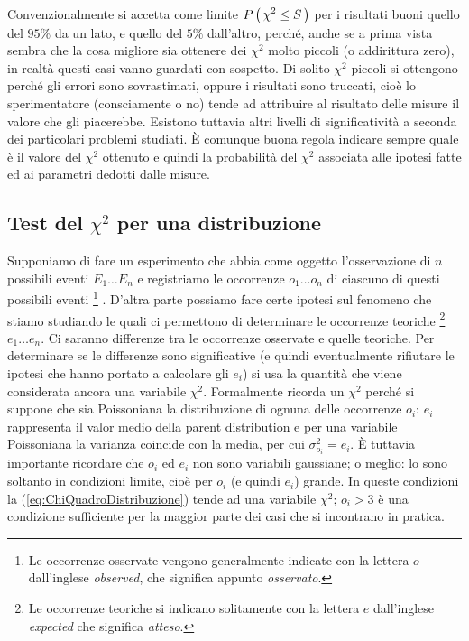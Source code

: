 Convenzionalmente si accetta come limite $\displaystyle P\left(\, \chi^2\le S \, \right)$ per i risultati
buoni quello del $95\%$ da un lato, e quello del $5\%$ dall'altro, perch\'e,
anche se a prima vista sembra che la cosa migliore sia ottenere dei $\chi^2$
molto piccoli (o addirittura zero), in realt\`a questi casi vanno guardati con
sospetto. Di solito $\chi^2$ piccoli si ottengono perch\'e gli errori
sono sovrastimati, oppure i risultati sono truccati,
cio\`e lo sperimentatore (consciamente o no) tende ad attribuire al
risultato delle misure il valore che gli piacerebbe.
Esistono tuttavia altri livelli di significativit\`a a seconda dei
particolari problemi studiati. \`E comunque buona regola indicare sempre
quale \`e il valore del $\chi^2$ ottenuto e quindi la probabilit\`a del
$\chi^2$ associata alle ipotesi fatte ed ai parametri dedotti dalle misure.


\subsection{Test del \texorpdfstring{$\chi^2$}{chi2} per una distribuzione}

Supponiamo di fare un esperimento che abbia come oggetto l'osservazione
di $n$ possibili eventi $E_1 \ldots E_n$ e registriamo le
occorrenze $o_1 \ldots o_n$ di ciascuno di questi possibili eventi%
\footnote{
Le occorrenze osservate vengono generalmente indicate con la lettera $o$
dall'inglese \emph{observed}, che significa appunto \emph{osservato}.
}%
.
D'altra parte possiamo fare certe ipotesi
sul fenomeno che stiamo studiando le quali ci permettono di determinare
le occorrenze teoriche%
\footnote{
Le occorrenze teoriche si indicano solitamente con la lettera $e$ dall'inglese
\emph{expected} che significa \emph{atteso}.
}
$e_1 \ldots e_n$. Ci saranno
differenze tra le occorrenze osservate e quelle teoriche. Per determinare
se le differenze sono significative (e quindi eventualmente rifiutare
le ipotesi che hanno portato a calcolare gli $e_i$) si usa la quantit\`a
che viene considerata ancora una variabile $\chi^2$.
Formalmente ricorda un $\chi^2$ perch\'e si suppone che sia Poissoniana la
distribuzione di ognuna delle occorrenze $o_i$: $e_i$ rappresenta il valor
medio della parent distribution  e per una variabile Poissoniana la varianza
coincide con la media, per cui $\sigma^2_{o_i} = e_i$.
\`E tuttavia importante ricordare che  $o_i$ ed $e_i$ non sono variabili
gaussiane; o meglio: lo sono soltanto in condizioni limite,
cio\`e per $o_i$ (e quindi $e_i$) grande. In queste condizioni la
(\ref{eq:ChiQuadroDistribuzione}) tende ad una variabile $\chi^2$; $o_i>3$
\`e una condizione sufficiente per la maggior parte dei casi
che si incontrano in pratica.

